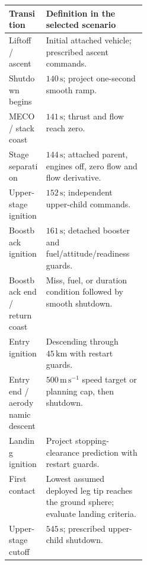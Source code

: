 \par\medskip\noindent\begin{minipage}{\linewidth}
\centering\small
\begin{tabularx}{\linewidth}{@{}p{0.27\linewidth}X@{}}
\toprule
Transition & Definition in the selected scenario \\
\midrule
Liftoff / ascent & Initial attached vehicle; prescribed ascent commands. \\
Shutdown begins & $140\,\mathrm{s}$; project one-second smooth ramp. \\
MECO / stack coast & $141\,\mathrm{s}$; thrust and flow reach zero. \\
Stage separation & $144\,\mathrm{s}$; attached parent, engines off, zero flow and flow derivative. \\
Upper-stage ignition & $152\,\mathrm{s}$; independent upper-child commands. \\
Boostback ignition & $161\,\mathrm{s}$; detached booster and fuel/attitude/readiness guards. \\
Boostback end / return coast & Miss, fuel, or duration condition followed by smooth shutdown. \\
Entry ignition & Descending through $45\,\mathrm{km}$ with restart guards. \\
Entry end / aerodynamic descent & $500\,\mathrm{m\,s^{-1}}$ speed target or planning cap, then shutdown. \\
Landing ignition & Project stopping-clearance prediction with restart guards. \\
First contact & Lowest assumed deployed leg tip reaches the ground sphere; evaluate landing criteria. \\
Upper-stage cutoff & $545\,\mathrm{s}$; prescribed upper-child shutdown. \\
\bottomrule
\end{tabularx}
\label{tab:phases}
\end{minipage}\par\medskip

